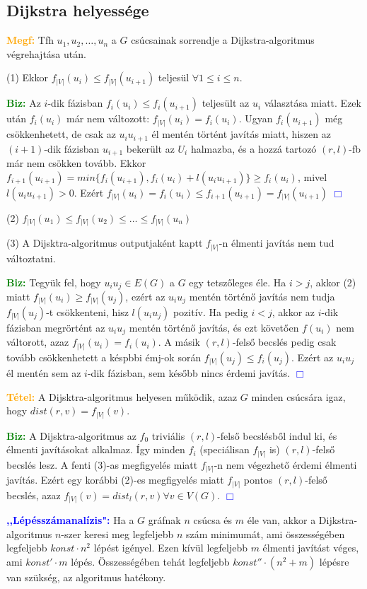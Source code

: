 \documentclass[../szamtud.tex]{subfiles}
\begin{document}
		\subsection{Dijkstra helyessége}
				
			\textcolor{orange}{\textbf{Megf:}} Tfh $u_1, u_2, \dots, u_n$ a $G$ csúcsainak sorrendje a Dijkstra-algoritmus végrehajtása után. 

			(1) Ekkor $f_{|V|}(u_i) \leq f_{|V|}(u_{i+1})$ teljesül $\forall 1 \leq i \leq n$.

			\textcolor{green}{\textbf{Biz:}} Az $i$-dik fázisban $f_i(u_i) \leq f_i(u_{i+1})$ teljesült az $u_i$ választása miatt. Ezek után $f_i(u_i)$ már nem változott: $f_{|V|}(u_i) = f_i(u_i)$. Ugyan $f_i(u_{i+1})$ még csökkenhetett, de csak az $u_iu_{i+1}$ él mentén történt javítás miatt, hiszen az $(i+1)$-dik fázisban $u_{i+1}$ bekerült az $U_i$ halmazba, és a hozzá tartozó $(r,l)$-fb már nem csökken tovább. Ekkor $f_{i+1}(u_{i+1}) = min \{f_i(u_{i+1}),f_i(u_i)+l(u_iu_{i+1})\} \geq f_i(u_i)$, mivel $l(u_iu_{i+1}) > 0$. Ezért $f_{|V|}(u_i) = f_i(u_i) \leq f_{i+1}(u_{i+1}) = f_{|V|}(u_{i+1})$  \textcolor{blue}{$\Box$}

			(2) $f_{|V|}(u_1) \leq f_{|V|}(u_2) \leq \dots \leq f_{|V|}(u_n)$

			(3) A Dijsktra-algoritmus outputjaként kaptt $f_{|V|}$-n élmenti javítás nem tud változtatni.
 
			\textcolor{green}{\textbf{Biz:}} Tegyük fel, hogy $u_iu_j \in E(G)$ a $G$ egy tetszőleges éle. Ha $i > j$, akkor (2) miatt $f_{|V|}(u_i) \geq f_{|V|}(u_j)$, ezért az $u_iu_j$ mentén történő javítás nem tudja $f_{|V|}(u_j)$-t csökkenteni, hisz $l(u_iu_j)$ pozitív. Ha pedig $i < j$, akkor az $i$-dik fázisban megrörtént az $u_iu_j$ mentén történő javítás, és ezt követően $f(u_i)$  nem váltorott, azaz $f_{|V|}(u_i) = f_i(u_i)$. A másik $(r,l)$-felső becslés pedig csak tovább csökkenhetett a késpbbi émj-ok során $f_{|V|}(u_j) \leq f_i(u_j)$. Ezért az $u_iu_j$ él mentén sem az $i$-dik fázisban, sem később nincs érdemi javítás.  \textcolor{blue}{$\Box$}

			\textcolor{orange}{\textbf{Tétel:}} A Dijsktra-algoritmus helyesen működik, azaz $G$ minden csúcsára igaz, hogy $dist(r,v) = f_{|V|}(v)$.

			\textcolor{green}{\textbf{Biz:}} A Dijsktra-algoritmus az $f_0$ triviális $(r,l)$-felső becslésből indul ki, és élmenti javításokat alkalmaz. Így minden $f_i$ (speciálisan $f_{|V|}$ is) $(r,l)$-felső becslés lesz. A fenti (3)-as megfigyelés miatt $f_{|V|}$-n nem  végezhető érdemi élmenti javítás. Ezért egy korábbi (2)-es megfigyelés miatt $f_{|V|}$ pontos $(r,l)$-felső becslés, azaz $f_{|V|}(v) = dist_l(r,v) \forall v \in V(G)$.  \textcolor{blue}{$\Box$}

			\textbf{\textcolor{blue}{,,Lépésszámanalízis":}} Ha a $G$ gráfnak $n$ csúcsa és $m$ éle van, akkor a Dijkstra-algoritmus $n$-szer keresi meg legfeljebb $n$ szám minimumát, ami összességében legfeljebb $konst \cdot n^2$ lépést igényel. Ezen kívül legfeljebb $m$ élmenti javítást véges, ami $konst' \cdot m$ lépés. Összességében tehát legfeljebb $konst'' \cdot (n^2 + m)$ lépésre van szükség, az algoritmus hatékony. 
\end{document}
